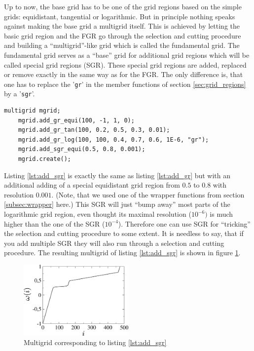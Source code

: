 Up to now, the base grid has to be one of the grid regions based on the simple grids: equidistant, tangential or logarithmic. But in principle nothing speaks against making the base grid a multigrid itself. This is achieved by letting the basic grid region and the FGR go through the selection and cutting procedure and building a ``multigrid''-like grid which is called the fundamental grid. The fundamental grid serves as a ``base'' grid for additional grid regions which will be called special grid regions (SGR). These special grid regions are added, replaced or remove exactly in the same way as for the FGR. The only difference is, that one has to replace the '\texttt{gr}' in the member functions of section \ref{sec:grid_regions} by a '\texttt{sgr}'.
\begin{lstlisting}[caption={Example for adding special grid regions},label={lst:add_sgr}]
	multigrid mgrid;
	mgrid.add_gr_equi(100, -1, 1, 0);
	mgrid.add_gr_tan(100, 0.2, 0.5, 0.3, 0.01);
	mgrid.add_gr_log(100, 100, 0.4, 0.7, 0.6, 1E-6, "gr");
	mgrid.add_sgr_equi(0.5, 0.8, 0.001);
	mgrid.create();
\end{lstlisting}
Listing \ref{lst:add_sgr} is exactly the same as listing \ref{lst:add_gr} but with an additional adding of a special equidistant grid region from $0.5$ to $0.8$ with resolution $0.001$. (Note, that we used one of the wrapper functions from section \ref{subsec:wrapper} here.) This SGR will just ``bump away'' most parts of the logarithmic grid region, even thought its maximal resolution ($10^{-6})$ is much higher than the one of the SGR ($10^{-4}$). Therefore one can use SGR for ``tricking'' the selection and cutting procedure to some extent. It is needless to say, that if you add multiple SGR they will also run through a selection and cutting procedure. The resulting multigrid of listing \ref{lst:add_sgr} is shown in figure \ref{fig:example_add_sgr}.
\begin{figure}[h]
	\centering
	\includegraphics[width=0.5\textwidth]{pics/example_add_sgr.eps}
	\caption{Multigrid corresponding to listing \ref{lst:add_sgr}}
	\label{fig:example_add_sgr}
\end{figure}

